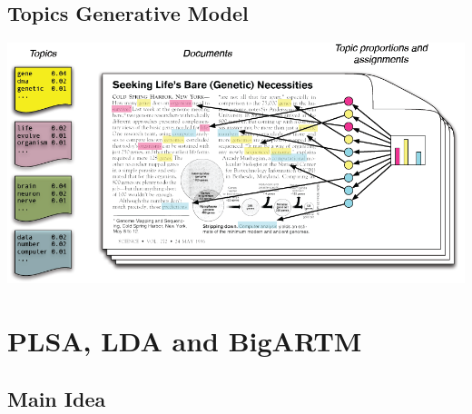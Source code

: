 \documentclass{beamer}
\begin{document}
\subsection*{Topics Generative Model}
\begin{frame}	
	\centering \includegraphics[scale=0.35]{img/gen}
\end{frame}

\section{PLSA, LDA and BigARTM}
\subsection*{Main Idea}
\end{document}
